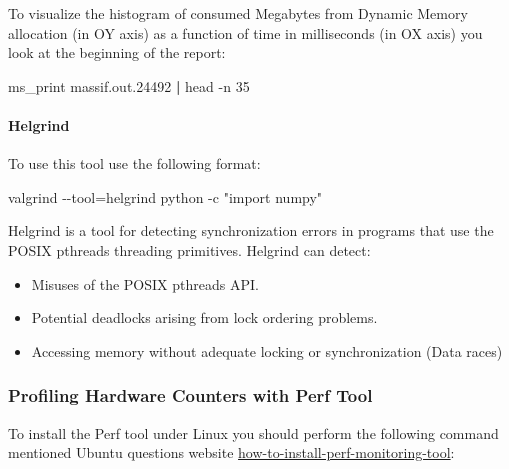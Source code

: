 \documentclass[
]{article}
\newenvironment{Shaded}{}{}
\newcommand{\AttributeTok}[1]{\textcolor[rgb]{0.49,0.56,0.16}{#1}}
\newcommand{\ExtensionTok}[1]{#1}
\newcommand{\FunctionTok}[1]{\textcolor[rgb]{0.02,0.16,0.49}{#1}}
\newcommand{\KeywordTok}[1]{\textcolor[rgb]{0.00,0.44,0.13}{\textbf{#1}}}
\newcommand{\NormalTok}[1]{#1}
\newcommand{\OperatorTok}[1]{\textcolor[rgb]{0.40,0.40,0.40}{#1}}
\newcommand{\StringTok}[1]{\textcolor[rgb]{0.25,0.44,0.63}{#1}}
\begin{document}
To visualize the histogram of consumed Megabytes from Dynamic Memory
allocation (in OY axis) as a function of time in milliseconds (in OX
axis) you look at the beginning of the report:

\begin{Shaded}
\begin{Highlighting}[]
\ExtensionTok{ms\_print}\NormalTok{ massif.out.24492 }\KeywordTok{|} \FunctionTok{head} \AttributeTok{{-}n}\NormalTok{ 35}
\end{Highlighting}
\end{Shaded}

\hypertarget{helgrind}{%
\paragraph{Helgrind}\label{helgrind}}

To use this tool use the following format:

\begin{Shaded}
\begin{Highlighting}[]
\FunctionTok{valgrind} \AttributeTok{{-}{-}tool}\OperatorTok{=}\NormalTok{helgrind python }\AttributeTok{{-}c} \StringTok{"import numpy"}
\end{Highlighting}
\end{Shaded}

Helgrind is a tool for detecting synchronization errors in programs that
use the POSIX pthreads threading primitives. Helgrind can detect:

\begin{itemize}
\item
  Misuses of the POSIX pthreads API.
\item
  Potential deadlocks arising from lock ordering problems.
\item
  Accessing memory without adequate locking or synchronization (Data
  races)
\end{itemize}

\hypertarget{profiling-hardware-counters-with-perf-tool}{%
\subsubsection{Profiling Hardware Counters with Perf
Tool}\label{profiling-hardware-counters-with-perf-tool}}

To install the Perf tool under Linux you should perform the following
command mentioned Ubuntu questions website
\href{https://askubuntu.com/questions/50145/how-to-install-perf-monitoring-tool}{how-to-install-perf-monitoring-tool}:
\end{document}
